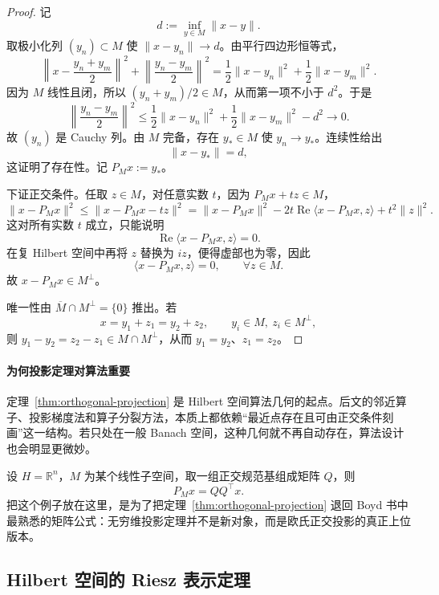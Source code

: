 \begin{proof}
记
\[
d:=\inf_{y\in M}\|x-y\|.
\]
取极小化列 $(y_n)\subset M$ 使 $\|x-y_n\|\to d$。由平行四边形恒等式，
\[
\left\|x-\frac{y_n+y_m}{2}\right\|^2+\left\|\frac{y_n-y_m}{2}\right\|^2
=\frac12\|x-y_n\|^2+\frac12\|x-y_m\|^2 .
\]
因为 $M$ 线性且闭，所以 $(y_n+y_m)/2\in M$，从而第一项不小于 $d^2$。于是
\[
\left\|\frac{y_n-y_m}{2}\right\|^2
\le
\frac12\|x-y_n\|^2+\frac12\|x-y_m\|^2-d^2\to 0.
\]
故 $(y_n)$ 是 Cauchy 列。由 $M$ 完备，存在 $y_\ast\in M$ 使 $y_n\to y_\ast$。连续性给出
\[
\|x-y_\ast\|=d,
\]
这证明了存在性。记 $P_Mx:=y_\ast$。

下证正交条件。任取 $z\in M$，对任意实数 $t$，因为 $P_Mx+tz\in M$，
\[
\|x-P_Mx\|^2\le \|x-P_Mx-tz\|^2
=\|x-P_Mx\|^2-2t\operatorname{Re}\langle x-P_Mx,z\rangle+t^2\|z\|^2.
\]
这对所有实数 $t$ 成立，只能说明
\[
\operatorname{Re}\langle x-P_Mx,z\rangle=0.
\]
在复 Hilbert 空间中再将 $z$ 替换为 $iz$，便得虚部也为零，因此
\[
\langle x-P_Mx,z\rangle=0,\qquad \forall z\in M.
\]
故 $x-P_Mx\in M^\perp$。

唯一性由 $\overline{M}\cap M^\perp=\{0\}$ 推出。若
\[
x=y_1+z_1=y_2+z_2,\qquad y_i\in M,\ z_i\in M^\perp,
\]
则 $y_1-y_2=z_2-z_1\in M\cap M^\perp$，从而 $y_1=y_2$、$z_1=z_2$。
\end{proof}

\paragraph{为何投影定理对算法重要}

\begin{remark}
定理~\ref{thm:orthogonal-projection} 是 Hilbert 空间算法几何的起点。后文的邻近算子、投影梯度法和算子分裂方法，本质上都依赖“最近点存在且可由正交条件刻画”这一结构。若只处在一般 Banach 空间，这种几何就不再自动存在，算法设计也会明显更微妙。
\end{remark}

\begin{example}[欧氏空间中的正交投影]\label{ex:euclidean-projection}
设 $H=\mathbb R^n$，$M$ 为某个线性子空间，取一组正交规范基组成矩阵 $Q$，则
\[
P_Mx=QQ^\top x.
\]
把这个例子放在这里，是为了把定理~\ref{thm:orthogonal-projection} 退回 Boyd 书中最熟悉的矩阵公式：无穷维投影定理并不是新对象，而是欧氏正交投影的真正上位版本。
\end{example}

\subsection{Hilbert 空间的 Riesz 表示定理}


